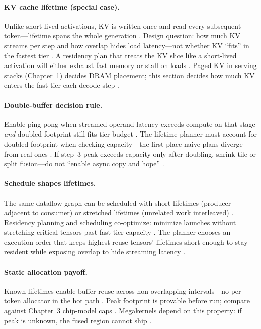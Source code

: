 \paragraph{KV cache lifetime (special case).}
Unlike short-lived activations, KV is written once and read every subsequent token---lifetime spans the whole generation \citep{kwon2023vllm,dao2023flashdecoding}.
Design question: how much KV streams per step and how overlap hides load latency---not whether KV ``fits'' in the fastest tier \citep{patel2025llminference}.
A residency plan that treats the KV slice like a short-lived activation will either exhaust fast memory or stall on loads \citep{dao2022flashattention,memoryfloor2026}.
Paged KV in serving stacks (Chapter~1) decides DRAM placement; this section decides how much KV enters the fast tier each decode step \citep{kwon2023vllm,yirage2026}.

\paragraph{Double-buffer decision rule.}
Enable ping-pong when streamed operand latency exceeds compute on that stage \emph{and} doubled footprint still fits tier budget \citep{semianalysis2024tma,dao2022flashattention}.
The lifetime planner must account for doubled footprint when checking capacity---the first place naive plans diverge from real ones \citep{yirage2026,memoryfloor2026}.
If step~3 peak exceeds capacity only after doubling, shrink tile or split fusion---do not ``enable async copy and hope'' \citep{semianalysis2024tma,taxbreak2026}.

\paragraph{Schedule shapes lifetimes.}
The same dataflow graph can be scheduled with short lifetimes (producer adjacent to consumer) or stretched lifetimes (unrelated work interleaved) \citep{wu2024mirage,dlbook}.
Residency planning and scheduling co-optimize: minimize launches without stretching critical tensors past fast-tier capacity \citep{taxbreak2026,memoryfloor2026}.
The planner chooses an execution order that keeps highest-reuse tensors' lifetimes short enough to stay resident while exposing overlap to hide streaming latency \citep{patel2025llminference,dao2022flashattention}.

\paragraph{Static allocation payoff.}
Known lifetimes enable buffer reuse across non-overlapping intervals---no per-token allocator in the hot path \citep{rotem2018glow,yirage2026}.
Peak footprint is provable before run; compare against Chapter~3 chip-model caps \citep{chen2020compilerbasedhardw}.
Megakernels depend on this property: if peak is unknown, the fused region cannot ship \citep{wu2024mirage,mpk2025,taxbreak2026}.

